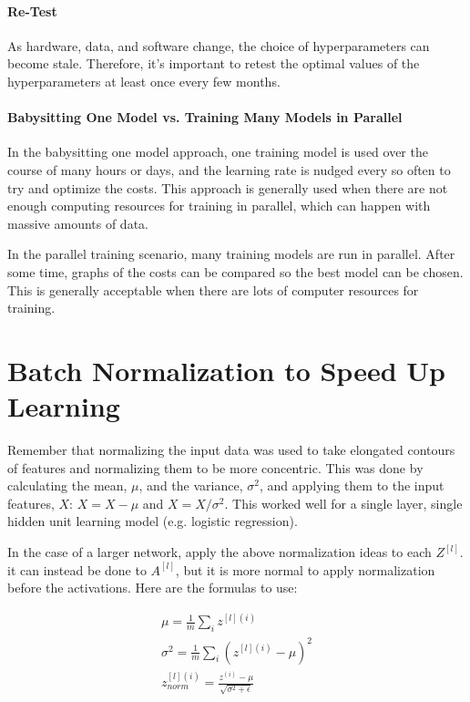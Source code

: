 \documentclass{article}
\begin{document}
\paragraph{Re-Test}

As hardware, data, and software change, the choice of hyperparameters can become stale.  Therefore, it's important to retest the optimal values of the hyperparameters at least once every few months.

\paragraph{Babysitting One Model vs. Training Many Models in Parallel}

In the babysitting one model approach, one training model is used over the course of many hours or days, and the learning rate is nudged every so often to try and optimize the costs.  This approach is generally used when there are not enough computing resources for training in parallel, which can happen with massive amounts of data.

In the parallel training scenario, many training models are run in parallel.  After some time, graphs of the costs can be compared so the best model can be chosen.  This is generally acceptable when there are lots of computer resources for training.

\section{Batch Normalization to Speed Up Learning}

Remember that normalizing the input data was used to take elongated contours of features and normalizing them to be more concentric.  This was done by calculating the mean, $\mu$, and the variance, $\sigma^2$, and applying them to the input features, $X$: $X = X - \mu$ and $X = X / \sigma^2$.  This worked well for a single layer, single hidden unit learning model (e.g. logistic regression).

In the case of a larger network, apply the above normalization ideas to each $Z^{[l]}$.  it can instead be done to $A^{[l]}$, but it is more normal to apply normalization before the activations.  Here are the formulas to use:

\begin{gather}
\mu = \frac{1}{m} \sum_i z^{[l](i)} \\
\sigma^2 = \frac{1}{m} \sum_i \left(z^{[l](i)} - \mu\right)^2 \\
z_{norm}^{[l](i)} = \frac{z^{(i)} - \mu}{\sqrt{\sigma^2 + \epsilon}}
\end{gather}
\end{document}
